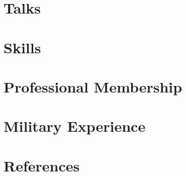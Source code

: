\documentclass[letter,11pt]{article}
\begin{document}
\newpage

\section{Talks}


\newpage

\section{Skills}


\section{Professional Membership}


\section{Military Experience}


\section{References}

\end{document}
